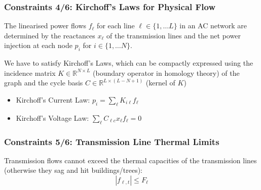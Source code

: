 \documentclass[10pt,aspectratio=169,dvipsnames]{beamer}
\newcommand{\R}{\mathbb{R}}
\let\olditem\item
\renewcommand{\item}{%
\olditem\vspace{5pt}}
\begin{document}
\begin{frame}
  \frametitle{Constraints 4/6: Kirchoff's Laws for Physical Flow}

  The linearised \alert{power flows} $f_\ell$ for each line $\ell \in
  \{1,\dots L\}$ in an AC network are determined by the
  \alert{reactances} $x_\ell$ of the transmission lines and the
  \alert{net power injection} at each node $p_i$ for $i\in\{1,\dots
  N\}$.


  We have to satisfy Kirchoff's Laws, which can be compactly expressed
  using the \alert{incidence matrix} $K \in \R^{N\times L}$ (boundary
  operator in homology theory) of the graph and the \alert{cycle
    basis} $C \in \R^{L\times(L-N+1)}$ (kernel of $K$)

  \begin{itemize}
  \item  Kirchoff's Current Law: $p_i = \sum_{\ell} K_{i\ell} f_\ell$
  \item  Kirchoff's Voltage Law: $\sum_\ell C_{\ell c} x_\ell f_\ell = 0$
  \end{itemize}

\end{frame}



\begin{frame}
  \frametitle{Constraints 5/6: Transmission Line Thermal Limits}

    Transmission flows cannot exceed the thermal capacities of the transmission lines (otherwise they sag and hit buildings/trees):
    \begin{equation*}
      | f_{\ell,t} | \leq  F_\ell
    \end{equation*}

\end{frame}
\end{document}
